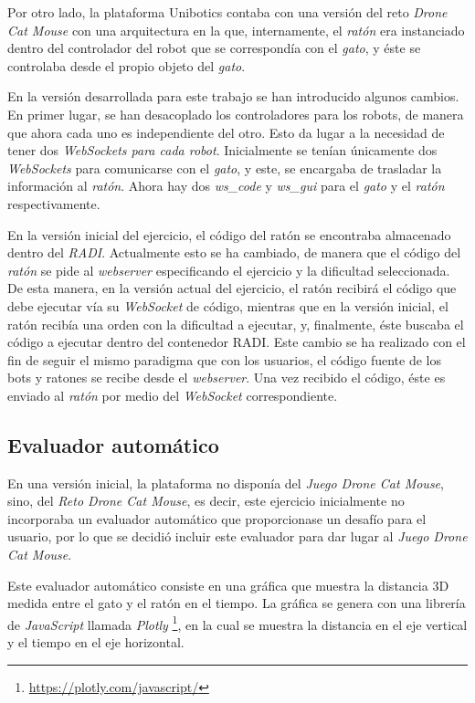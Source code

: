 \documentclass[a4paper, 12pt]{book}
\begin{document}
Por otro lado, la plataforma Unibotics contaba con una versión del reto \emph{Drone Cat Mouse} con una arquitectura en la que, internamente, el \emph{ratón} era instanciado dentro del controlador del robot que se correspondía con el \emph{gato}, y éste se controlaba desde el propio objeto del \emph{gato}.

En la versión desarrollada para este trabajo se han introducido algunos cambios. En primer lugar, se han desacoplado los controladores para los robots, de manera que ahora cada uno es independiente del otro. Esto da lugar a la necesidad de tener dos \emph{WebSockets para cada robot}. Inicialmente se tenían únicamente dos \emph{WebSockets} para comunicarse con el \emph{gato}, y este, se encargaba de trasladar la información al \emph{ratón}. Ahora hay dos \emph{ws\_code} y \emph{ws\_gui} para el \emph{gato} y el \emph{ratón} respectivamente.

En la versión inicial del ejercicio, el código del ratón se encontraba almacenado dentro del \emph{RADI}. Actualmente esto se ha cambiado, de manera que el código del \emph{ratón} se pide al \emph{webserver} especificando el ejercicio y la dificultad seleccionada. De esta manera, en la versión actual del ejercicio, el ratón recibirá el código que debe ejecutar vía su \emph{WebSocket} de código, mientras que en la versión inicial, el ratón recibía una orden con la dificultad a ejecutar, y, finalmente, éste buscaba el código a ejecutar dentro del contenedor RADI. Este cambio se ha realizado con el fin de seguir el mismo paradigma que con los usuarios, el código fuente de los bots y ratones se recibe desde el \emph{webserver}. Una vez recibido el código, éste es enviado al \emph{ratón} por medio del \emph{WebSocket} correspondiente.

\subsection{Evaluador automático}
\label{drone_cat_mouse_evaluator}

En una versión inicial, la plataforma no disponía del \emph{Juego Drone Cat Mouse}, sino, del \emph{Reto Drone Cat Mouse}, es decir, este ejercicio inicialmente no incorporaba un evaluador automático que proporcionase un desafío para el usuario, por lo que se decidió incluir este evaluador para dar lugar al \emph{Juego Drone Cat Mouse}. 

Este evaluador automático consiste en una gráfica que muestra la distancia 3D medida entre el gato y el ratón en el tiempo. La gráfica se genera con una librería de \emph{JavaScript} llamada \emph{Plotly} \footnote{\url{https://plotly.com/javascript/}}, en la cual se muestra la distancia en el eje vertical y el tiempo en el eje horizontal.
\end{document}
